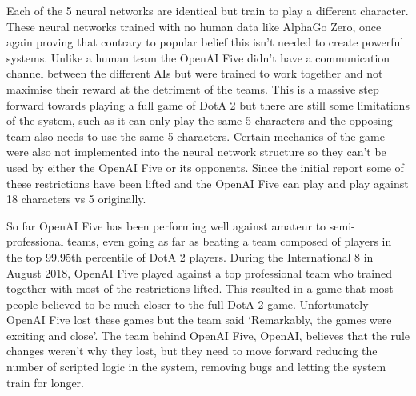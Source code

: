 \documentclass[a4paper]{article}
\begin{document}
Each of the 5 neural networks are identical but train to play a different character.
These neural networks trained with no human data like AlphaGo Zero, once again proving that contrary to popular belief this isn't needed to create powerful systems.
Unlike a human team the OpenAI Five didn't have a communication channel between the different AIs but were trained to work together and not maximise their reward at the detriment of the teams.
This is a massive step forward towards playing a full game of DotA 2 but there are still some limitations of the system, such as it can only play the same 5 characters and the opposing team also needs to use the same 5 characters.
Certain mechanics of the game were also not implemented into the neural network structure so they can't be used by either the OpenAI Five or its opponents.
Since the initial report some of these restrictions have been lifted and the OpenAI Five can play and play against 18 characters vs 5 originally.
\par
So far OpenAI Five has been performing well against amateur to semi-professional teams, even going as far as beating a team composed of players in the top 99.95th percentile of DotA 2 players.
During the International 8 in August 2018, OpenAI Five played against a top professional team who trained together with most of the restrictions lifted.
This resulted in a game that most people believed to be much closer to the full DotA 2 game.
Unfortunately OpenAI Five lost these games but the team said `Remarkably, the games were exciting and close'\cite{OpenAIInternational}.
The team behind OpenAI Five, OpenAI, believes that the rule changes weren't why they lost, but they need to move forward reducing the number of scripted logic in the system, removing bugs and letting the system train for longer.
\end{document}
